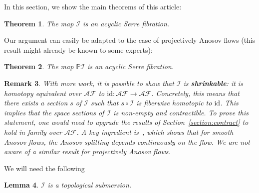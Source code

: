 \documentclass[letterpaper, 11pt]{article}
\numberwithin{equation}{section}
\newtheorem{thm}{Theorem}[section]
\newtheorem{lem}[thm]{Lemma}
\newtheorem{rem}[thm]{Remark}
\begin{document}
In this section, we show the main theorems of this article:

\begin{thm} \label{thm:homeq} The map $\mathcal{I}$ is an acyclic Serre fibration.
\end{thm}

Our argument can easily be adapted to the case of projectively Anosov flows (this result might already be known to some experts):

\begin{thm} \label{thm:homeqproj} The map $\mathbb{P} \mathcal{I}$ is an acyclic Serre fibration.
\end{thm}

\begin{rem} With more work, it is possible to show that $\mathcal{I}$ is \textbf{shrinkable}: it is homotopy equivalent over $\mathcal{AF}$ to $\mathrm{id} :  \mathcal{AF} \rightarrow \mathcal{AF}$. Concretely, this means that there exists a section $s$ of $\mathcal{I}$ such that $s \circ \mathcal{I}$ is \emph{fiberwise homotopic} to $\mathrm{id}$. This implies that the space sections of $\mathcal{I}$ is non-empty and contractible. To prove this statement, one would need to upgrade the results of Section~\ref{section:contract} to hold \emph{in family over $\mathcal{AF}$}. A key ingredient is~\cite[Lemma 2.1]{LMM}, which shows that for smooth Anosov flows, the Anosov splitting depends continuously on the flow. We are not aware of a similar result for projectively Anosov flows.
\end{rem}

We will need the following 
\begin{lem} \label{lem:topsub}
$\mathcal{I}$ is a topological submersion.
\end{lem}
\end{document}
